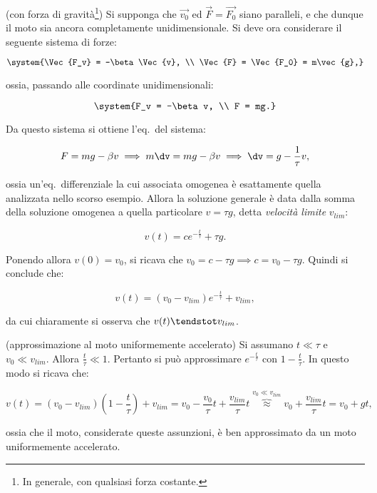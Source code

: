 \documentclass[11pt]{article}
\begin{document}
	\begin{example} (con forza di gravità\footnote{In generale,
			con qualsiasi forza costante.}) Si supponga che $\Vec{v_0}$
		ed $\Vec{F} = \Vec{F_0}$ siano paralleli, e che dunque il
		moto sia ancora completamente unidimensionale. 
		Si deve ora considerare il seguente sistema di forze:
		
		\[ \system{\Vec{F_v} = -\beta \Vec{v}, \\ \Vec{F} = \Vec{F_0} = m\vec{g},} \]
		
		ossia, passando alle coordinate unidimensionali:
		
		\[ \system{F_v = -\beta v, \\ F = mg.} \]
		
		Da questo sistema si ottiene l'eq.~del sistema:
		
		\vskip 0.1in
		
		\[ F = mg - \beta v \implies m \dv = mg - \beta v \implies \dv = g - \frac{1}{\tau} v, \]
		
		ossia un'eq.~differenziale la cui associata omogenea è
		esattamente quella analizzata nello scorso esempio. Allora
		la soluzione generale è data dalla somma della soluzione
		omogenea a quella particolare $v = \tau g$, detta
		\textit{velocità limite} $v_{lim}$:
		
		\[ v(t) = c e^{-\frac{t}{\tau}} + \tau g. \]
		
		Ponendo allora $v(0) = v_0$, si ricava che $v_0 = c - \tau g \implies c = v_0 - \tau g$. Quindi si conclude che:
		
		\[ v(t) = (v_0 - v_{lim}) e^{-\frac{t}{\tau}} + v_{lim}, \]
		
		da cui chiaramente si osserva che $v(t) \tendstot v_{lim}$.
		
	\end{example}
	
	\begin{example} (approssimazione al moto uniformemente accelerato)
		Si assumano $t \ll \tau$ e $v_0 \ll v_{lim}$. Allora
		$\frac{t}{\tau} \ll 1$. Pertanto si può approssimare
		$e^{-\frac{t}{\tau}}$ con $1 - \frac{t}{\tau}$.
		In questo modo si ricava che:
		
		\[ v(t) = (v_0 - v_{lim})(1 - \frac{t}{\tau}) + v_{lim} =
		v_0 - \frac{v_0}{\tau}t + \frac{v_{lim}}{\tau} t
		\overbrace{\approx}^{v_0 \ll v_{lim}} v_0 + \frac{v_{lim}}{\tau} t = v_0 + gt,\]
		
		ossia che il moto, considerate queste assunzioni, è ben approssimato
		da un moto uniformemente accelerato.
	\end{example}
	
\end{document}
